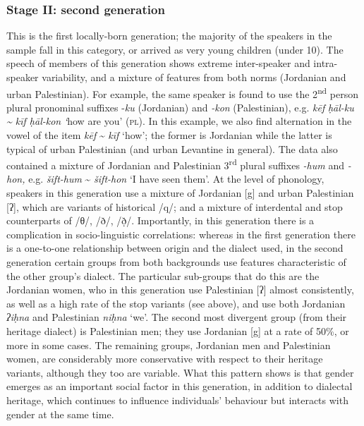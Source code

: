 \documentclass[output=paper]{langsci/langscibook}
\begin{document}
\subsubsection{Stage II: second generation}
This is the first locally-born generation; the majority of the speakers in the sample fall in this category, or arrived as very young children (under 10). The speech of members of this generation shows extreme inter-speaker and intra-speaker variability, and a mixture of features from both norms (Jordanian and urban Palestinian). For example, the same speaker is found to use the 2\textsuperscript{nd} person plural pronominal suffixes -\textit{ku} (Jordanian) and \textit{{}-kon} (Palestinian), e.g. \textit{kēf} \textit{ḥāl-ku} \textit{{\textasciitilde} kīf ḥāl-kon} \textit{‘}how are you’ (\textsc{pl}). In this example, we also find alternation in the vowel of the item \textit{kēf}  {\textasciitilde} \textit{kīf} ‘how’; the former is Jordanian while the latter is typical of urban Palestinian (and urban Levantine in general). The data also contained a mixture of Jordanian and Palestinian 3\textsuperscript{rd} plural suffixes \textit{{}-hum} and \textit{\--hon,} e.g. \textit{šift-hum} {\textasciitilde} \textit{šift-hon} ‘I have seen them’. At the level of phonology, speakers in this generation use a mixture of Jordanian [g] and urban Palestinian [ʔ], which are variants of historical /q/; and a mixture of interdental and stop counterparts of /θ/, /ð/, /ð̣/. Importantly, in this generation there is a complication in socio-linguistic correlations: whereas in the first generation there is a one-to-one relationship between origin and the dialect used, in the second generation certain groups from both backgrounds use features characteristic of the other group’s dialect. The particular sub-groups that do this are the Jordanian women, who in this generation use Palestinian [ʔ] almost consistently, as well as a high rate of the stop variants (see above), and use both Jordanian \textit{ʔiḥna} and Palestinian \textit{niḥna} ‘we’. The second most divergent group (from their heritage dialect) is Palestinian men; they use Jordanian [g] at a rate of 50\%, or more in some cases. The remaining groups, Jordanian men and Palestinian women, are considerably more conservative with respect to their heritage variants, although they too are variable. What this pattern shows is that gender emerges as an important social factor in this generation, in addition to dialectal heritage, which continues to influence individuals’ behaviour but interacts with gender at the same time. 
\end{document}
